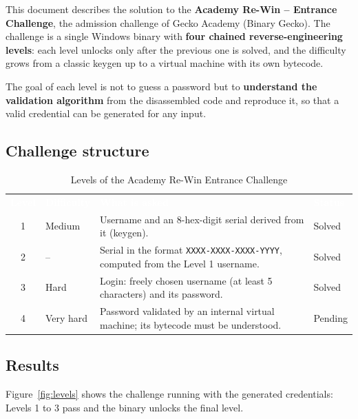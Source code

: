 This document describes the solution to the \textbf{Academy Re-Win -- Entrance Challenge}, the admission challenge of Gecko Academy (Binary Gecko). The challenge is a single Windows binary with \textbf{four chained reverse-engineering levels}: each level unlocks only after the previous one is solved, and the difficulty grows from a classic keygen up to a virtual machine with its own bytecode.

The goal of each level is not to guess a password but to \textbf{understand the validation algorithm} from the disassembled code and reproduce it, so that a valid credential can be generated for any input.

\subsection{Challenge structure}

\begin{table}[H]
\centering
{}
\begin{tabularx}{\linewidth}{c l X l}
\rowcolor{TableHeaderBgRowColor}
\textcolor{white}{\textbf{Level}} & \textcolor{white}{\textbf{Difficulty}} & \textcolor{white}{\textbf{What is asked}} & \textcolor{white}{\textbf{Status}} \\
1 & Medium & Username and an 8-hex-digit serial derived from it (keygen). & Solved \\
2 & -- & Serial in the format \texttt{XXXX-XXXX-XXXX-YYYY}, computed from the Level 1 username. & Solved \\
3 & Hard & Login: freely chosen username (at least 5 characters) and its password. & Solved \\
4 & Very hard & Password validated by an internal virtual machine; its bytecode must be understood. & Pending \\
\end{tabularx}
\caption{Levels of the Academy Re-Win Entrance Challenge}
\end{table}

\subsection{Results}

Figure~\ref{fig:levels} shows the challenge running with the generated credentials: Levels 1 to 3 pass and the binary unlocks the final level.

